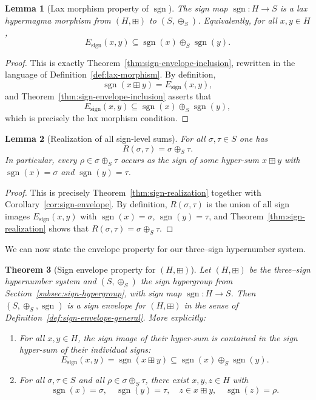 \documentclass[11pt]{amsart}
\numberwithin{equation}{section}
\newtheorem{theorem}{Theorem}[section]
\newtheorem{lemma}[theorem]{Lemma}
\theoremstyle{definition}
\theoremstyle{remark}
\newcommand{\Hnum}{H}                      %
\newcommand{\Sset}{S}                      %
\newcommand{\sgn}{\operatorname{sgn}}
\newcommand{\op}{\boxplus}                 %
\newcommand{\sop}{\oplus_S}                %
\begin{document}
\begin{lemma}[Lax morphism property of $\sgn$]
\label{lem:sgn-lax-morphism}
The sign map $\sgn:\Hnum\to\Sset$ is a lax hypermagma morphism from
$(\Hnum,\op)$ to $(\Sset,\sop)$.  Equivalently, for all
$x,y\in\Hnum$,
\[
  E_{\mathrm{sign}}(x,y)
  \subseteq
  \sgn(x)\sop\sgn(y).
\]
\end{lemma}

\begin{proof}
This is exactly Theorem~\ref{thm:sign-envelope-inclusion}, rewritten in
the language of Definition~\ref{def:lax-morphism}.  By definition,
\[
  \sgn(x\op y) = E_{\mathrm{sign}}(x,y),
\]
and Theorem~\ref{thm:sign-envelope-inclusion} asserts that
\[
  E_{\mathrm{sign}}(x,y)
  \subseteq \sgn(x)\sop\sgn(y),
\]
which is precisely the lax morphism condition.
\end{proof}

\begin{lemma}[Realization of all sign-level sums]
\label{lem:sign-realization-again}
For all $\sigma,\tau\in\Sset$ one has
\[
  R(\sigma,\tau)
  = \sigma\sop\tau.
\]
In particular, every $\rho\in\sigma\sop\tau$ occurs as the sign of
some hyper-sum $x\op y$ with $\sgn(x)=\sigma$ and $\sgn(y)=\tau$.
\end{lemma}

\begin{proof}
This is precisely Theorem~\ref{thm:sign-realization} together with
Corollary~\ref{cor:sign-envelope}.  By definition,
$R(\sigma,\tau)$ is the union of all sign images
$E_{\mathrm{sign}}(x,y)$ with $\sgn(x)=\sigma$, $\sgn(y)=\tau$, and
Theorem~\ref{thm:sign-realization} shows that
$R(\sigma,\tau)=\sigma\sop\tau$.
\end{proof}

We can now state the envelope property for our three--sign hypernumber
system.

\begin{theorem}[Sign envelope property for $(\Hnum,\op)$]
\label{thm:envelope-property}
Let $(\Hnum,\op)$ be the three--sign hypernumber system and
$(\Sset,\sop)$ the sign hypergroup from
Section~\ref{subsec:sign-hypergroup}, with sign map
$\sgn:\Hnum\to\Sset$.  Then $(\Sset,\sop,\sgn)$ is a sign envelope for
$(\Hnum,\op)$ in the sense of Definition~\ref{def:sign-envelope-general}.
More explicitly:
\begin{enumerate}
  \item For all $x,y\in\Hnum$, the sign image of their hyper-sum is
        contained in the sign hyper-sum of their individual signs:
  \[
    E_{\mathrm{sign}}(x,y)
    = \sgn(x\op y)
    \subseteq
    \sgn(x)\sop\sgn(y).
  \]
  \item For all $\sigma,\tau\in\Sset$ and all
        $\rho\in\sigma\sop\tau$, there exist $x,y,z\in\Hnum$ with
  \[
    \sgn(x)=\sigma,\quad \sgn(y)=\tau,\quad z\in x\op y,\quad
    \sgn(z)=\rho.
  \]
\end{enumerate}
\end{theorem}
\end{document}
